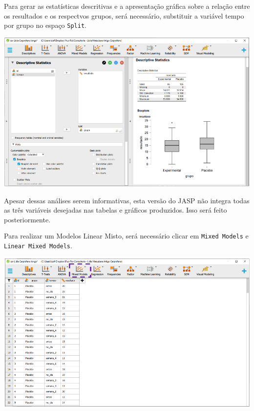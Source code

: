 \documentclass[
]{book}
\begin{document}
Para gerar as estatísticas descritivas e a apresentação gráfica sobre a relação entre os resultados e os respectvos grupos, será necessário, substituir a variável tempo por grupo no espaço \texttt{Split}.

\includegraphics{./img/cap_lmm_boxplots2.png}

Apesar dessas análises serem informativas, esta versão do JASP não integra todas as três variáveis desejadas nas tabelas e gráficos produzidos. Isso será feito posteriormente.

Para realizar um Modelos Linear Misto, será necessário clicar em \texttt{Mixed\ Models} e \texttt{Linear\ Mixed\ Models}.

\includegraphics{./img/cap_lmm_interface.png}
\end{document}

